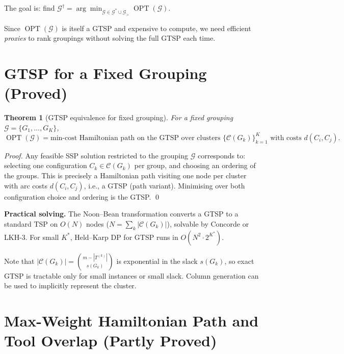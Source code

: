 \documentclass[11pt,a4paper]{article}
\theoremstyle{plain}
\newtheorem{theorem}{Theorem}[section]
\theoremstyle{definition}
\DeclareMathOperator{\OPT}{OPT}
\newcommand{\Kstar}{K^*}
\newcommand{\calG}{\mathcal{G}}
\begin{document}
The goal is: find $\calG^{\dag} = \arg\min_{\calG \in \mathcal{G}^* \cup \mathcal{G}_{>}} \OPT(\calG)$.

Since $\OPT(\calG)$ is itself a GTSP and expensive to compute, we need efficient
\emph{proxies} to rank groupings without solving the full GTSP each time.

\section{GTSP for a Fixed Grouping (Proved)}
\label{sec:gtsp_fixed}

\begin{thmbox}
\begin{theorem}[GTSP equivalence for fixed grouping]
\label{thm:gtsp_fixed}
For a fixed grouping $\calG = \{G_1,\ldots,G_K\}$,
\[
  \OPT(\calG) = \text{min-cost Hamiltonian path on the GTSP over clusters }
  \{\mathcal{C}(G_k)\}_{k=1}^K
  \text{ with costs } d(C_i, C_j).
\]
\end{theorem}
\end{thmbox}

\begin{proofbox}
\begin{proof}
Any feasible SSP solution restricted to the grouping $\calG$ corresponds to:
selecting one configuration $C_k \in \mathcal{C}(G_k)$ per group, and choosing
an ordering of the groups. This is precisely a Hamiltonian path visiting one node
per cluster with arc costs $d(C_i,C_j)$, i.e., a GTSP (path variant).
Minimising over both configuration choice and ordering is the GTSP. \qed
\end{proof}
\end{proofbox}

\noindent\textbf{Practical solving.}
The Noon--Bean transformation \cite{Noon1993} converts a GTSP to a standard TSP
on $O(N)$ nodes ($N = \sum_k |\mathcal{C}(G_k)|$), solvable by Concorde or LKH-3.
For small $\Kstar$, Held--Karp DP for GTSP runs in $O(N^2 \cdot 2^{K^*})$.

Note that $|\mathcal{C}(G_k)| = \binom{m-|T^{(k)}|}{s(G_k)}$ is exponential in
the slack $s(G_k)$, so exact GTSP is tractable only for small instances or
small slack. Column generation can be used to implicitly represent the cluster.

\section{Max-Weight Hamiltonian Path and Tool Overlap (Partly Proved)}
\label{sec:mwhp}
\end{document}
